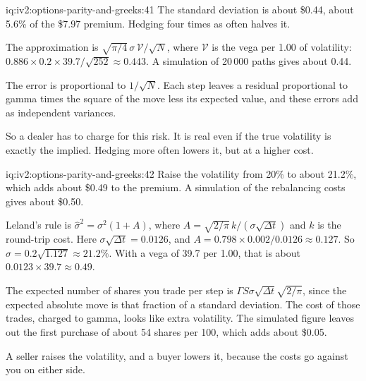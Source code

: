 \begin{solution}{iq:iv2:options-parity-and-greeks:41}
The standard deviation is about \$0.44, about 5.6\% of the \$7.97 premium. Hedging four times as often halves it.

The approximation is $\sqrt{\pi/4}\,\sigma\,\mathcal V/\sqrt N$, where $\mathcal V$ is the vega per 1.00 of volatility: $0.886 \times 0.2 \times 39.7/\sqrt{252} \approx 0.443$. A simulation of 20\,000 paths gives about 0.44.

The error is proportional to $1/\sqrt N$. Each step leaves a residual proportional to gamma times the square of the move less its expected value, and these errors add as independent variances.

So a dealer has to charge for this risk. It is real even if the true volatility is exactly the implied. Hedging more often lowers it, but at a higher cost.

\end{solution}

\begin{solution}{iq:iv2:options-parity-and-greeks:42}
Raise the volatility from 20\% to about 21.2\%, which adds about \$0.49 to the premium. A simulation of the rebalancing costs gives about \$0.50.

Leland's rule is $\hat\sigma^2 = \sigma^2(1 + A)$, where $A = \sqrt{2/\pi}\,k/(\sigma\sqrt{\Delta t})$ and $k$ is the round-trip cost. Here $\sigma\sqrt{\Delta t} = 0.0126$, and $A = 0.798 \times 0.002/0.0126 \approx 0.127$. So $\hat\sigma = 0.2\sqrt{1.127} \approx 21.2\%$. With a vega of 39.7 per 1.00, that is about $0.0123 \times 39.7 \approx 0.49$.

The expected number of shares you trade per step is $\Gamma S\sigma\sqrt{\Delta t}\sqrt{2/\pi}$, since the expected absolute move is that fraction of a standard deviation. The cost of those trades, charged to gamma, looks like extra volatility. The simulated figure leaves out the first purchase of about 54 shares per 100, which adds about \$0.05.

A seller raises the volatility, and a buyer lowers it, because the costs go against you on either side.

\end{solution}

